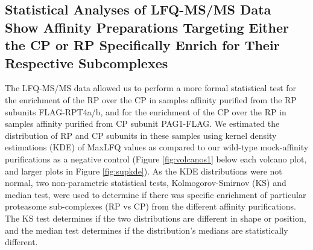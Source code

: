 \subsection{Statistical Analyses of LFQ-MS/MS Data Show Affinity Preparations Targeting Either the CP or RP Specifically Enrich for Their Respective Subcomplexes}
The LFQ-MS/MS data allowed us to perform a more formal statistical test for the enrichment of the RP over the CP in samples affinity purified from the RP subunits FLAG-RPT4a/b, and for the enrichment of the CP over the RP in samples affinity purified from CP subunit PAG1-FLAG. We estimated the distribution of RP and CP subunits in these samples using kernel density estimations (KDE) of MaxLFQ values as compared to our wild-type mock-affinity purifications as a negative control (Figure \ref{fig:volcanos1} below each volcano plot, and larger plots in Figure \ref{fig:supkde}).  As the KDE distributions were not normal, two non-parametric statistical tests, Kolmogorov-Smirnov (KS) and median test, were used to determine if there was specific enrichment of particular proteasome sub-complexes (RP vs CP) from the different affinity purifications. The KS test determines if the two distributions are different in shape or position, and the median test determines if the distribution’s medians are statistically different.


